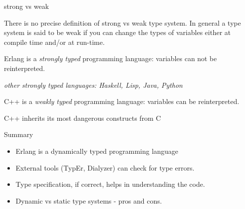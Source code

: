 \begin{frame}{strong vs weak}

There is no precise definition of strong vs weak type system. In
general a type system is said to be weak if you can change the types
of variables either at compile time and/or at run-time.

\pause\vspace{20pt}

Erlang is a {\em strongly typed} programming language: variables can not be reinterpreted.

\vspace{10pt}

{\em other strongly typed languages: Haskell, Lisp, Java, Python}

\pause\vspace{20pt}

C++ is a {\em weakly typed} programming language: variables can be reinterpreted.

\vspace{10pt}

{C++ inherits its most dangerous constructs from  C}

\end{frame}

\begin{frame}{Summary}

\begin{itemize}
\item Erlang is a dynamically typed programming language
\item External tools (TypEr, Dialyzer) can check for type errors.
\item Type specification, if correct, helps in understanding the code.
\item Dynamic vs static type systems - pros and cons.
\end{itemize}


\end{frame}




